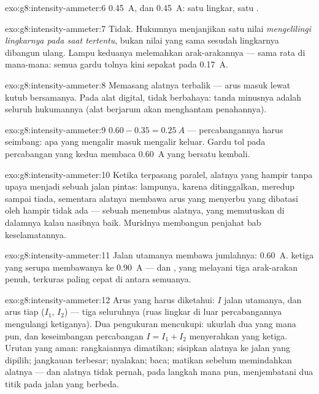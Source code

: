 \begin{solution}{exo:g8:intensity-ammeter:6}
\qty{0.45}{A}, dan \qty{0.45}{A}: satu lingkar, satu .
\end{solution}

\begin{solution}{exo:g8:intensity-ammeter:7}
Tidak. Hukumnya menjanjikan satu nilai \emph{mengelilingi lingkarnya
pada saat tertentu}, bukan nilai yang sama sesudah lingkarnya dibangun
ulang. Lampu keduanya melemahkan arak-arakannya --- sama rata di
mana-mana: semua gardu tolnya kini sepakat pada \qty{0.17}{A}.
\end{solution}

\begin{solution}{exo:g8:intensity-ammeter:8}
Memasang alatnya terbalik --- arus masuk lewat kutub bersamanya. Pada
alat digital, tidak berbahaya: tanda minusnya adalah seluruh hukumannya
(alat berjarum akan menghantam penahannya).
\end{solution}

\begin{solution}{exo:g8:intensity-ammeter:9}
$0.60 - 0.35 = \qty{0.25}{A}$ --- percabangannya harus seimbang: apa
yang mengalir masuk mengalir keluar. Gardu tol pada percabangan yang
kedua membaca \qty{0.60}{A} yang bersatu kembali.
\end{solution}

\begin{solution}{exo:g8:intensity-ammeter:10}
Ketika terpasang paralel, alatnya yang hampir tanpa upaya menjadi
sebuah jalan pintas: lampunya, karena ditinggalkan, meredup sampai
tiada, sementara alatnya membawa arus yang menyerbu yang dibatasi oleh
hampir tidak ada --- sebuah  menembus alatnya, yang
memutuskan  di dalamnya kalau nasibnya baik. Muridnya membangun
penjahat bab keselamatannya.
\end{solution}

\begin{solution}{exo:g8:intensity-ammeter:11}
Jalan utamanya membawa jumlahnya: \qty{0.60}{A}.  ketiga yang
serupa membawanya ke \qty{0.90}{A} --- dan , yang melayani
tiga arak-arakan penuh, terkuras paling cepat di antara semuanya.
\end{solution}

\begin{solution}{exo:g8:intensity-ammeter:12}
Arus yang harus diketahui: $I$ jalan utamanya, dan arus tiap 
($I_1$, $I_2$) --- tiga seluruhnya (ruas lingkar di luar percabangannya
mengulangi ketiganya). Dua pengukuran mencukupi: ukurlah dua yang mana
pun, dan keseimbangan percabangan $I = I_1 + I_2$ menyerahkan yang
ketiga. Urutan yang aman: rangkaiannya dimatikan; sisipkan alatnya ke
jalan yang dipilih; jangkauan terbesar; nyalakan; baca; matikan
sebelum memindahkan alatnya --- dan alatnya tidak pernah, pada langkah
mana pun, menjembatani dua titik pada jalan yang berbeda.
\end{solution}

